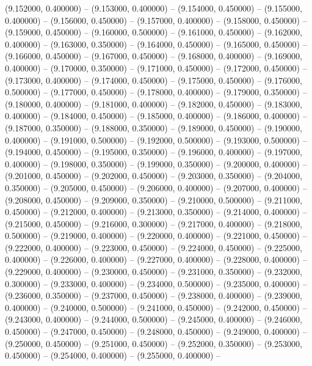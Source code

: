 (9.152000, 0.400000) -- 
(9.153000, 0.400000) -- 
(9.154000, 0.450000) -- 
(9.155000, 0.400000) -- 
(9.156000, 0.450000) -- 
(9.157000, 0.400000) -- 
(9.158000, 0.450000) -- 
(9.159000, 0.450000) -- 
(9.160000, 0.500000) -- 
(9.161000, 0.450000) -- 
(9.162000, 0.400000) -- 
(9.163000, 0.350000) -- 
(9.164000, 0.450000) -- 
(9.165000, 0.450000) -- 
(9.166000, 0.450000) -- 
(9.167000, 0.450000) -- 
(9.168000, 0.400000) -- 
(9.169000, 0.400000) -- 
(9.170000, 0.350000) -- 
(9.171000, 0.450000) -- 
(9.172000, 0.450000) -- 
(9.173000, 0.400000) -- 
(9.174000, 0.450000) -- 
(9.175000, 0.450000) -- 
(9.176000, 0.500000) -- 
(9.177000, 0.450000) -- 
(9.178000, 0.400000) -- 
(9.179000, 0.350000) -- 
(9.180000, 0.400000) -- 
(9.181000, 0.400000) -- 
(9.182000, 0.450000) -- 
(9.183000, 0.400000) -- 
(9.184000, 0.450000) -- 
(9.185000, 0.400000) -- 
(9.186000, 0.400000) -- 
(9.187000, 0.350000) -- 
(9.188000, 0.350000) -- 
(9.189000, 0.450000) -- 
(9.190000, 0.400000) -- 
(9.191000, 0.500000) -- 
(9.192000, 0.500000) -- 
(9.193000, 0.500000) -- 
(9.194000, 0.450000) -- 
(9.195000, 0.350000) -- 
(9.196000, 0.400000) -- 
(9.197000, 0.400000) -- 
(9.198000, 0.350000) -- 
(9.199000, 0.350000) -- 
(9.200000, 0.400000) -- 
(9.201000, 0.450000) -- 
(9.202000, 0.450000) -- 
(9.203000, 0.350000) -- 
(9.204000, 0.350000) -- 
(9.205000, 0.450000) -- 
(9.206000, 0.400000) -- 
(9.207000, 0.400000) -- 
(9.208000, 0.450000) -- 
(9.209000, 0.350000) -- 
(9.210000, 0.500000) -- 
(9.211000, 0.450000) -- 
(9.212000, 0.400000) -- 
(9.213000, 0.350000) -- 
(9.214000, 0.400000) -- 
(9.215000, 0.450000) -- 
(9.216000, 0.300000) -- 
(9.217000, 0.400000) -- 
(9.218000, 0.500000) -- 
(9.219000, 0.400000) -- 
(9.220000, 0.400000) -- 
(9.221000, 0.450000) -- 
(9.222000, 0.400000) -- 
(9.223000, 0.450000) -- 
(9.224000, 0.450000) -- 
(9.225000, 0.400000) -- 
(9.226000, 0.400000) -- 
(9.227000, 0.400000) -- 
(9.228000, 0.400000) -- 
(9.229000, 0.400000) -- 
(9.230000, 0.450000) -- 
(9.231000, 0.350000) -- 
(9.232000, 0.300000) -- 
(9.233000, 0.400000) -- 
(9.234000, 0.500000) -- 
(9.235000, 0.400000) -- 
(9.236000, 0.350000) -- 
(9.237000, 0.450000) -- 
(9.238000, 0.400000) -- 
(9.239000, 0.400000) -- 
(9.240000, 0.500000) -- 
(9.241000, 0.450000) -- 
(9.242000, 0.450000) -- 
(9.243000, 0.400000) -- 
(9.244000, 0.500000) -- 
(9.245000, 0.400000) -- 
(9.246000, 0.450000) -- 
(9.247000, 0.450000) -- 
(9.248000, 0.450000) -- 
(9.249000, 0.400000) -- 
(9.250000, 0.450000) -- 
(9.251000, 0.450000) -- 
(9.252000, 0.350000) -- 
(9.253000, 0.450000) -- 
(9.254000, 0.400000) -- 
(9.255000, 0.400000) -- 
